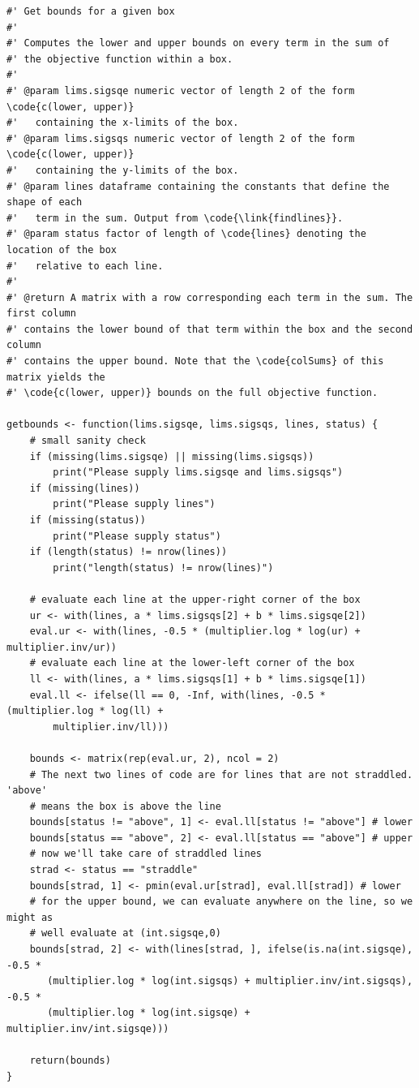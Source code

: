 \documentclass[ejs]{imsart}
\begin{document}
\begin{verbatim}
#' Get bounds for a given box
#'
#' Computes the lower and upper bounds on every term in the sum of
#' the objective function within a box.
#'
#' @param lims.sigsqe numeric vector of length 2 of the form \code{c(lower, upper)}
#'   containing the x-limits of the box.
#' @param lims.sigsqs numeric vector of length 2 of the form \code{c(lower, upper)}
#'   containing the y-limits of the box.
#' @param lines dataframe containing the constants that define the shape of each
#'   term in the sum. Output from \code{\link{findlines}}.
#' @param status factor of length of \code{lines} denoting the location of the box
#'   relative to each line.
#'
#' @return A matrix with a row corresponding each term in the sum. The first column
#' contains the lower bound of that term within the box and the second column
#' contains the upper bound. Note that the \code{colSums} of this matrix yields the
#' \code{c(lower, upper)} bounds on the full objective function.

getbounds <- function(lims.sigsqe, lims.sigsqs, lines, status) {
    # small sanity check
    if (missing(lims.sigsqe) || missing(lims.sigsqs))
        print("Please supply lims.sigsqe and lims.sigsqs")
    if (missing(lines))
        print("Please supply lines")
    if (missing(status))
        print("Please supply status")
    if (length(status) != nrow(lines))
        print("length(status) != nrow(lines)")

    # evaluate each line at the upper-right corner of the box
    ur <- with(lines, a * lims.sigsqs[2] + b * lims.sigsqe[2])
    eval.ur <- with(lines, -0.5 * (multiplier.log * log(ur) + multiplier.inv/ur))
    # evaluate each line at the lower-left corner of the box
    ll <- with(lines, a * lims.sigsqs[1] + b * lims.sigsqe[1])
    eval.ll <- ifelse(ll == 0, -Inf, with(lines, -0.5 * (multiplier.log * log(ll) +
        multiplier.inv/ll)))

    bounds <- matrix(rep(eval.ur, 2), ncol = 2)
    # The next two lines of code are for lines that are not straddled.  'above'
    # means the box is above the line
    bounds[status != "above", 1] <- eval.ll[status != "above"] # lower
    bounds[status == "above", 2] <- eval.ll[status == "above"] # upper
    # now we'll take care of straddled lines
    strad <- status == "straddle"
    bounds[strad, 1] <- pmin(eval.ur[strad], eval.ll[strad]) # lower
    # for the upper bound, we can evaluate anywhere on the line, so we might as
    # well evaluate at (int.sigsqe,0)
    bounds[strad, 2] <- with(lines[strad, ], ifelse(is.na(int.sigsqe), -0.5 *
       (multiplier.log * log(int.sigsqs) + multiplier.inv/int.sigsqs), -0.5 *
       (multiplier.log * log(int.sigsqe) + multiplier.inv/int.sigsqe)))

    return(bounds)
}
\end{verbatim}
\end{document}
